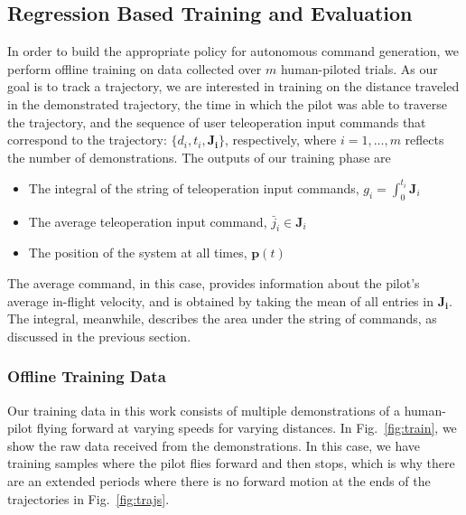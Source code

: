 \documentclass[letterpaper, 10 pt, conference]{ieeeconf}  %
\newcommand\NB[1]{$\spadesuit$\footnote{NB: #1}}
\begin{document}
\subsection{Regression Based Training and Evaluation} \label{sec:train}
In order to build the appropriate policy for autonomous command generation, we perform offline training on data collected over $m$ human-piloted trials. As our goal is to track a trajectory, we are interested in training on the distance traveled in the demonstrated trajectory, the time in which the pilot was able to traverse the trajectory, and the sequence of user teleoperation input commands that correspond to the trajectory: $\{d_i,t_i,\bm{J_i}\}$, respectively, where $i=1,\ldots,m$ reflects the number of demonstrations. %
The outputs of our training phase are \begin{itemize} %
    \item The integral of the string of teleoperation input commands, $g_i = \int_0^{t_i}\bm{J}_i$
    \item The average teleoperation input command, $\bar{j}_i \in \bm{J}_i$
    \item The position of the system at all times, $\bm{p}(t)$
\end{itemize}
The average command, in this case, provides information about the pilot's average in-flight velocity, and is obtained by taking the mean of all entries in $\bm{J_i}$. The integral, meanwhile, describes the area under the string of commands, as discussed in the previous section.

\subsubsection{Offline Training Data}

Our training data in this work consists of multiple demonstrations of a human-pilot flying forward at varying speeds for varying distances. In Fig.~\ref{fig:train}, we show the raw data received from the demonstrations. In this case, we have training samples where the pilot flies forward and then stops, which is why there are an extended periods where there is no forward motion at the ends of the trajectories in Fig.~\ref{fig:trajs}.
\end{document}
